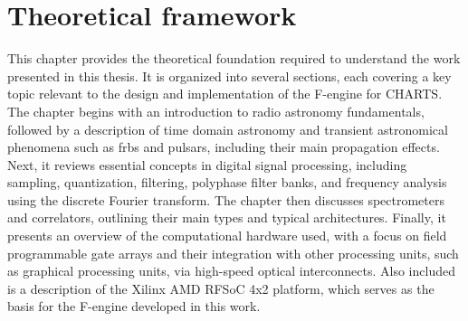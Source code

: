 
\chapter{Theoretical framework}
This chapter provides the theoretical foundation required to understand the work presented in this thesis. It is organized into several sections, each covering a key topic relevant to the design and implementation of the F-engine for CHARTS. The chapter begins with an introduction to radio astronomy fundamentals, followed by a description of time domain astronomy and transient astronomical phenomena such as \glspl{frb} and pulsars, including their main propagation effects. Next, it reviews essential concepts in digital signal processing, including sampling, quantization, filtering, polyphase filter banks, and frequency analysis using the discrete Fourier transform. The chapter then discusses spectrometers and correlators, outlining their main types and typical architectures. Finally, it presents an overview of the computational hardware used, with a focus on field programmable gate arrays and their integration with other processing units, such as graphical processing units, via high-speed optical interconnects. Also included is a description of the Xilinx AMD RFSoC 4x2 platform, which serves as the basis for the F-engine developed in this work.

